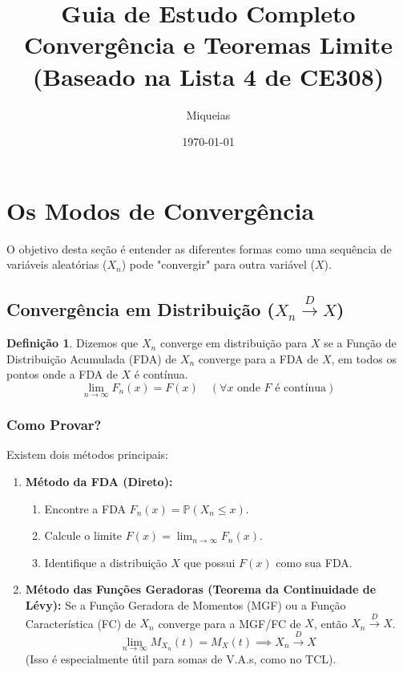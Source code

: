 \documentclass[a4paper, 10pt]{article} %
\title{Guia de Estudo Completo \\ Convergência e Teoremas Limite \\ \large (Baseado na Lista 4 de CE308)}
\author{Miqueias}
\date{\today}
\theoremstyle{definition}
\newtheorem{definition}{Definição}[section] %
\theoremstyle{plain}
\theoremstyle{remark}
\newcommand{\Prob}{\mathbb{P}}
\newcommand{\dto}{\xrightarrow{D}}      %
\begin{document}
\maketitle
\tableofcontents
\newpage

\section{Os Modos de Convergência}
\label{sec:modos}
O objetivo desta seção é entender as diferentes formas como uma sequência de variáveis aleatórias ($X_n$) pode "convergir" para outra variável ($X$).

\subsection{Convergência em Distribuição (\texorpdfstring{$X_n \dto X$}{X\_n -> D X})}
\label{sec:conv_dist}

\begin{definition}
Dizemos que $X_n$ converge em distribuição para $X$ se a Função de Distribuição Acumulada (FDA) de $X_n$ converge para a FDA de $X$, em todos os pontos onde a FDA de $X$ é contínua.
$$ \lim_{n \to \infty} F_n(x) = F(x) \quad (\forall x \text{ onde } F \text{ é contínua}) $$
\end{definition}

\subsubsection{Como Provar?}
Existem dois métodos principais:

\begin{enumerate}
    \item \textbf{Método da FDA (Direto):}
        \begin{enumerate}
            \item Encontre a FDA $F_n(x) = \Prob(X_n \le x)$.
            \item Calcule o limite $F(x) = \lim_{n \to \infty} F_n(x)$.
            \item Identifique a distribuição $X$ que possui $F(x)$ como sua FDA.
        \end{enumerate}

    \item \textbf{Método das Funções Geradoras (Teorema da Continuidade de Lévy):}
        Se a Função Geradora de Momentos (MGF) ou a Função Característica (FC) de $X_n$ converge para a MGF/FC de $X$, então $X_n \dto X$.
        $$ \lim_{n \to \infty} M_{X_n}(t) = M_X(t) \implies X_n \dto X $$
        (Isso é especialmente útil para somas de V.A.s, como no TCL).
\end{enumerate}
\end{document}
